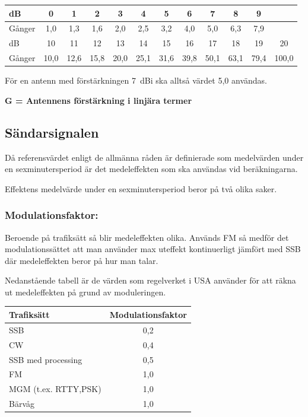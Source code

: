 \begin{tabular}{|l|ccccccccccc|}
\hline
dB     &  0  &  1  &  2  &  3  &  4  &  5  &  6  &  7  &  8  &  9  & \\ \hline
Gånger & 1,0 & 1,3 & 1,6 & 2,0 & 2,5 & 3,2 & 4,0 & 5,0 & 6,3 & 7,9 & \\ \hline
dB     &  10  &  11  &  12  &  13  &  14  &  15  &  16  &  17  &  18  &  19  &  20 \\ \hline
Gånger & 10,0 & 12,6 & 15,8 & 20,0 & 25,1 & 31,6 & 39,8 & 50,1 & 63,1 & 79,4 & 100,0 \\ \hline
\end{tabular}

För en antenn med förstärkningen 7~dBi ska alltså värdet 5,0 användas.

\textbf{G = Antennens förstärkning i linjära termer}

\subsection{Sändarsignalen}

Då referensvärdet enligt de allmänna råden är definierade som medelvärden under
en sexminutersperiod är det medeleffekten som ska användas vid beräkningarna.

Effektens medelvärde under en sexminutersperiod beror på två olika saker.

\subsubsection{Modulationsfaktor:}

Beroende på trafiksätt så blir medeleffekten olika.
Används FM så medför det modulationssättet att man använder max uteffekt
kontinuerligt jämfört med SSB där medeleffekten beror på hur man talar.

Nedanstående tabell är de värden som regelverket i USA använder för
att räkna ut medeleffekten på grund av moduleringen.

\begin{tabular}{|l|c|}
\hline
Trafiksätt & Modulationsfaktor \\ \hline
SSB & 0,2 \\ \hline
CW & 0,4 \\ \hline
SSB med processing & 0,5 \\ \hline
FM & 1,0 \\ \hline
MGM (t.ex. RTTY,PSK) & 1,0 \\ \hline
Bärvåg & 1,0 \\ \hline
\end{tabular}

